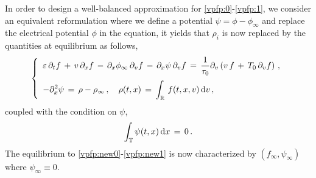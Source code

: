 \documentclass[11pt]{amsart}
\numberwithin{equation}{section}
\numberwithin{figure}{section}
\begin{document}
 In order to design a well-balanced approximation for
 \eqref{vpfp:0}-\eqref{vpfp:1}, we consider an equivalent
 reformulation where we  define a potential $\psi
 = \phi-\phi_\infty$ and  replace the  electrical potential $\phi$ in
 the equation, it yields that  $\rho_i$ is now replaced by the quantities at
 equilibrium as follows, 
\begin{equation}
	\label{vpfp:new0}
	\left\{
	\begin{array}{l}
		\displaystyle\varepsilon\,\partial_t f \,+\, v\,\partial_x f
		\,-\,\partial_{x}\phi_{\infty} \,\partial_v f 
		\,-\,\partial_{x}\psi \,\partial_v f 
		\,=\,\frac{1}{\tau_0}
		\partial_v \left( v \, f \,+\, T_0\,\partial_v f \right)\,,
		\\[1.1em]
		\displaystyle-\partial_{x}^2\psi \,=\, \rho-\rho_{\infty}\,,\quad \rho(t,x)\,=\,\int_{{\mathbb R}}\,f(t,x,v)\,\mathrm{d} v\,,
	\end{array}\right.
  \end{equation}
coupled with the condition on $\psi$,
 \begin{equation}
	\label{vpfp:new1}
\int_{\mathbb T} \psi(t,x) \,\mathrm{d} x\,=\, 0\,.
\end{equation}
The equilibrium to \eqref{vpfp:new0}-\eqref{vpfp:new1} is now characterized by
$(f_\infty,\psi_\infty)$ where $\psi_\infty\equiv 0$.

\end{document}
